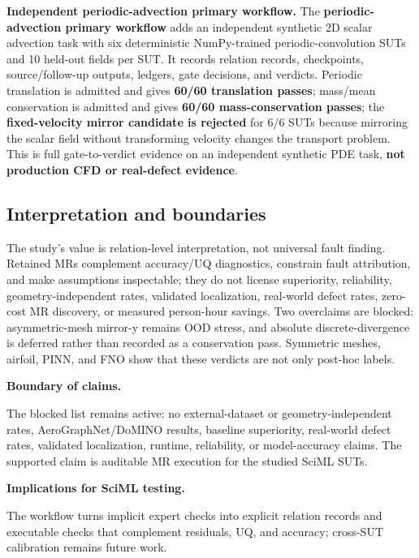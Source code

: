 \documentclass[preprint,12pt,authoryear]{elsarticle}
\begin{document}
\textbf{Independent periodic-advection primary workflow.} The \textbf{periodic-advection primary workflow} adds an independent synthetic 2D scalar advection task with six deterministic NumPy-trained periodic-convolution SUTs and 10 held-out fields per SUT. It records relation records, checkpoints, source/follow-up outputs, ledgers, gate decisions, and verdicts. Periodic translation is admitted and gives \textbf{60/60 translation passes}; mass/mean conservation is admitted and gives \textbf{60/60 mass-conservation passes}; the \textbf{fixed-velocity mirror candidate is rejected} for 6/6 SUTs because mirroring the scalar field without transforming velocity changes the transport problem. This is full gate-to-verdict evidence on an independent synthetic PDE task, \textbf{not production CFD or real-defect evidence}.

\subsection{Interpretation and boundaries}
\label{sec:discussion}
\label{subsec:still-blocked}
\label{subsec:scoped-interpretation}

The study's value is relation-level interpretation, not universal fault finding. Retained MRs complement accuracy/UQ diagnostics, constrain fault attribution, and make assumptions inspectable; they do not license superiority, reliability, geometry-independent rates, validated localization, real-world defect rates, zero-cost MR discovery, or measured person-hour savings. Two overclaims are blocked: asymmetric-mesh mirror-y remains OOD stress, and absolute discrete-divergence is deferred rather than recorded as a conservation pass. Symmetric meshes, airfoil, PINN, and FNO show that these verdicts are not only post-hoc labels.

\textbf{Boundary of claims.}
\label{subsec:boundary-claims}

The blocked list remains active: no external-dataset or geometry-independent rates, AeroGraphNet/DoMINO results, baseline superiority, real-world defect rates, validated localization, runtime, reliability, or model-accuracy claims. The supported claim is auditable MR execution for the studied SciML SUTs.

\textbf{Implications for SciML testing.}
\label{subsec:implications}

The workflow turns implicit expert checks into explicit relation records and executable checks that complement residuals, UQ, and accuracy; cross-SUT calibration remains future work.
\end{document}
